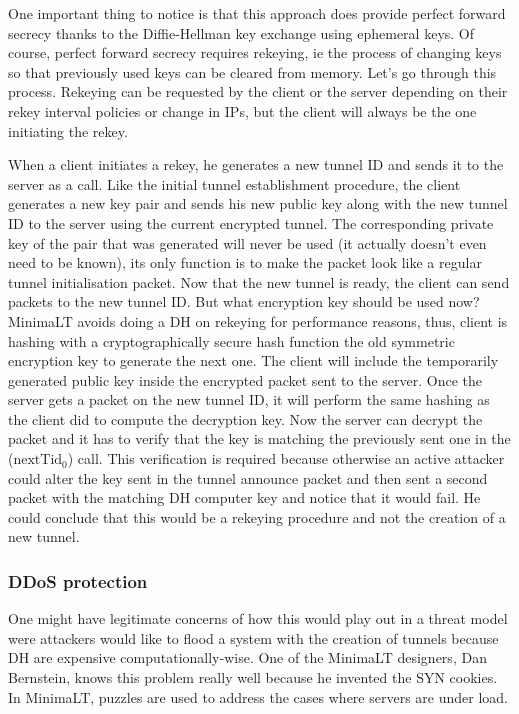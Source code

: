 \documentclass{vldb}
\begin{document}
One important thing to notice is that this approach does provide perfect forward secrecy thanks to the Diffie-Hellman key exchange using ephemeral keys. Of course, perfect forward secrecy requires rekeying, ie the process of changing keys so that previously used keys can be cleared from memory. Let's go through this process. Rekeying can be requested by the client or the server depending on their rekey interval policies or change in IPs, but the client will always be the one initiating the rekey.

When a client initiates a rekey, he generates a new tunnel ID and sends it to the server as a call. Like the initial tunnel establishment procedure, the client generates a new key pair and sends his new public key along with the new tunnel ID to the server using the current encrypted tunnel. The corresponding private key of the pair that was generated will never be used (it actually doesn't even need to be known), its only function is to make the packet look like a regular tunnel initialisation packet. Now that the new tunnel is ready, the client can send packets to the new tunnel ID. But what encryption key should be used now? MinimaLT avoids doing a DH on rekeying for performance reasons, thus, client is hashing with a cryptographically secure hash function the old symmetric encryption key to generate the next one. The client will include the temporarily generated public key inside the encrypted packet sent to the server. Once the server gets a packet on the new tunnel ID, it will perform the same hashing as the client did to compute the decryption key. Now the server can decrypt the packet and it has to verify that the key is matching the previously sent one in the (\emph{$\text{nextTid}_{0}$}) call. This verification is required\cite{MinimaLT} because otherwise an active attacker could alter the key sent in the tunnel announce packet and then sent a second packet with the matching DH computer key and notice that it would fail. He could conclude that this would be a rekeying procedure and not the creation of a new tunnel.


\subsubsection{DDoS protection}

One might have legitimate concerns of how this would play out in a threat model were attackers would like to flood a system with the creation of tunnels because DH are expensive computationally-wise. One of the MinimaLT designers, Dan Bernstein, knows this problem really well because he invented the SYN cookies. In MinimaLT, puzzles are used to address the cases where servers are under load.
\end{document}
